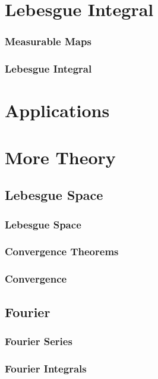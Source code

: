 \documentclass[a4paper]{book}
\theoremstyle{definition}
\begin{document}
\part{Lebesgue Integral}
\section{Measurable Maps}

\section{Lebesgue Integral}
%
\part{Applications}
%
\part{More Theory}
\chapter{Lebesgue Space}
\section{Lebesgue Space}

\section{Convergence Theorems}

\section{Convergence}

\chapter{Fourier}
\section{Fourier Series}

\section{Fourier Integrals}

\end{document}
